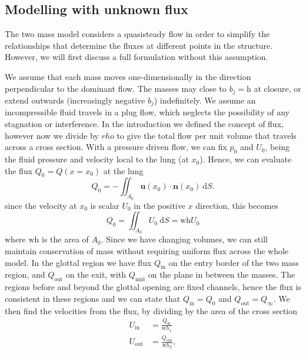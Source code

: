 \subsection{Modelling with unknown flux}

The two mass model considers a quasisteady flow in order to simplify the relationships that determine the fluxes at different points in the structure.
However, we will first discuss a full formulation without this assumption.

We assume that each mass moves one-dimensionally in the direction perpendicular to the dominant flow.
The masses may close to $b_j = \mathrm{h}$ at closure, or extend outwards (increasingly negative $b_j$) indefinitely.
We assume an incompressible fluid travels in a plug flow, which neglects the possibility of any stagnation or interference.
In the introduction we defined the concept of flux,
however now we divide by $rho$ to give the total flow per unit volume that travels across a cross section.
With a pressure driven flow, we can fix $p_0$ and $U_0$, being the fluid pressure and velocity local to the lung (at $x_0$).
Hence, we can evaluate the flux $Q_0 = Q(x=x_0)$ at the lung
\begin{equation}
	Q_0 = -\iint_{A_0} \mathbf{u}(x_0)\cdot \mathbf{n}(x_0)~\mathrm{d}S.
\end{equation}
since the velocity at $x_0$ is scalar $U_0$ in the positive $x$ direction,
this becomes
\begin{equation}
	Q_0 = \iint_{A_0} U_0~\mathrm{d}S = \mathrm{wh}U_0
\end{equation}
where $\mathrm{wh}$ is the area of $A_0$.
Since we have changing volumes,
we can still maintain conservation of mass without requiring uniform flux across the whole model.
In the glottal region we have flux $Q_\mathrm{in}$ on the entry border of the two mass region, and $Q_\mathrm{out}$ on the exit,
with $Q_\mathrm{mid}$ on the plane in between the masses.
The regions before and beyond the glottal opening are fixed channels,
hence the flux is consistent in these regions and we can state that $Q_\mathrm{in} = Q_0$ and $Q_\mathrm{out} = Q_\infty$.
We then find the velocities  from the flux, by dividing by the area of the cross section
\begin{equation}
	\begin{aligned}
		U_\mathrm{in} &= \frac{Q_\mathrm{in}}{\mathrm{w}h_1} \\
		U_\mathrm{out} &= \frac{Q_\mathrm{out}}{\mathrm{w}h_2},
	\end{aligned}
\end{equation}
